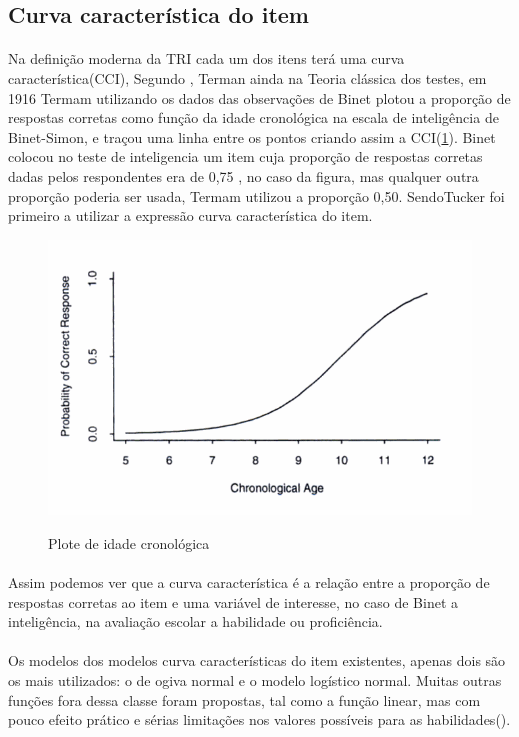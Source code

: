 	
\subsection{Curva característica do item}
    \paragraph{}
		Na definição moderna da TRI cada um dos itens terá uma curva característica(CCI), Segundo \cite{Baker}, Terman ainda na Teoria clássica dos testes, em 1916 Termam utilizando os dados das observações de Binet plotou a proporção de respostas corretas como função da idade cronológica na escala de inteligência de Binet-Simon, e traçou uma linha entre os pontos criando assim a CCI(\ref{fig:cci_age}). Binet colocou no teste de inteligencia um item cuja proporção de respostas corretas dadas pelos respondentes era de 0,75 , no caso da figura, mas qualquer outra proporção poderia ser usada, Termam utilizou a proporção 0,50. SendoTucker foi primeiro a utilizar a expressão curva característica do item.
	\begin{figure}[!h]
	    \centering
	    \caption{Plote de idade cronológica}
	    \includegraphics[width=0.5\linewidth]{img/age}
	    \label{fig:cci_age}
	\end{figure}
	   
	\paragraph{}
    	Assim podemos ver que a curva característica é a relação entre a proporção de respostas corretas ao item e uma variável de interesse, no caso de Binet a inteligência, na avaliação escolar a habilidade ou proficiência.
    \paragraph{}
    
    
        Os modelos dos modelos  curva características do item existentes, apenas dois são os mais utilizados: o 
         de ogiva normal e o modelo logístico normal. Muitas outras funções fora dessa classe foram propostas, tal como a função linear, mas com pouco efeito prático e sérias limitações nos valores possíveis para as habilidades(\cite{Ribeiro}).
